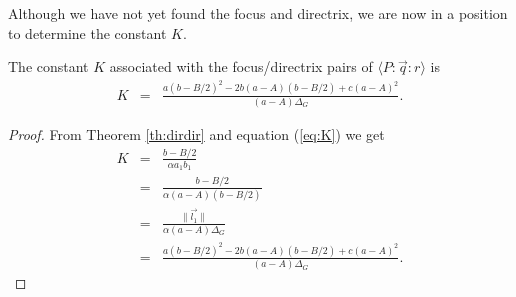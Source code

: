 Although we have not yet found the focus and directrix, we are now in a position to determine the constant $K$.

\begin{theorem} 
The constant $K$ associated with the focus/directrix pairs of $\langle P\!:\!\vec{q}\!:\!r \rangle$ is
\begin{eqnarray}
K & = & \frac{a(b - B/2)^2 -2b(a - A)(b - B/2) + c(a - A)^2}{(a - A)\Delta_G}.
\end{eqnarray}

\end{theorem}
\begin{proof}From Theorem \ref{th:dirdir} and equation (\ref{eq:K}) we get
\begin{eqnarray}
K & = & \frac{b - B/2}{\alpha a_1b_1}\nonumber\\
  & = & \frac{b - B/2}{\alpha(a - A)(b - B/2)}\nonumber\\
  & = & \frac{\|\vec{l_1}\|}{\alpha(a - A)\Delta_G}\nonumber\\
  & = & \frac{a(b - B/2)^2 -2b(a - A)(b - B/2) + c(a - A)^2}{(a - A)\Delta_G}.\nonumber
\end{eqnarray}
\end{proof}

